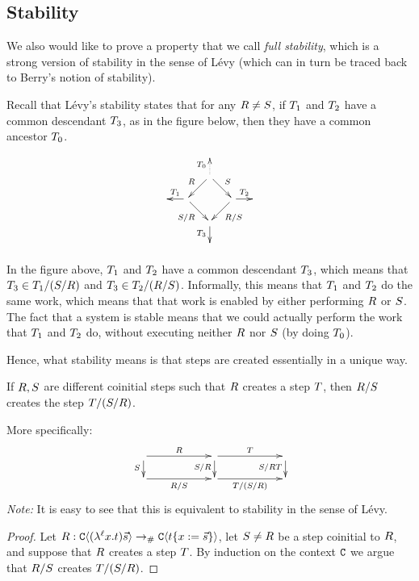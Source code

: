 \bigskip
\subsection*{Stability}

We also would like to prove a property that we call \emph{full stability},
which is a strong version of stability in the sense of Lévy \cite{levy_redex_stability}
(which can in turn be traced back to Berry's notion of stability).

Recall that L\'evy's stability states that for any $R \neq S$,
if $T_1$ and $T_2$ have a common descendant $T_3$, as in the figure below,
then they have a common ancestor $T_0$.
\[
  \xymatrix@C=.5cm@R=.5cm{
    &&&
  \\
    &
    & \ar@{.>}[u]^{\redexthree_0} \ar[dl]_{\redex} \ar[dr]^{\redextwo} &
  \\
    &
    \ar[l]_{\redexthree_1}
    \ar[dr]_{\redextwo/\redex} & & \ar[dl]^{\redex/\redextwo} \ar[r]^{\redexthree_2} &
  \\
    &
    & \ar[d]_{\redexthree_3} &
  \\
    &&&
  }
\]

In the figure above, $T_1$ and $T_2$ have a common descendant
$T_3$, which means that $T_3 \in T_1 / (S / R)$
and $T_3 \in T_2 / (R / S)$.
Informally, this means that $T_1$ and $T_2$ do the same work,
which means that that work is enabled by either performing $R$ or $S$.
The fact that a system is stable means that we could actually perform the work that
$T_1$ and $T_2$ do, without executing neither $R$ nor $S$
(by doing $T_0$).

Hence, what stability means is that steps are created essentially in a unique way.


\begin{lemma}[Stability]
If $R,S$ are different coinitial steps such that
$R$ creates a step $T$,
then $R/S$ creates the step $T/(S/R)$.

More specifically:
\[
  \xymatrix@R=.5cm@C=2cm{
    \ar[r]^{\redex}
    \ar[d]_{\redextwo}
    &
    \ar[r]^{\redexthree}
    \ar[d]_{\redextwo/\redex}
    &
    \ar[d]_{\redextwo/\redex\redexthree}
  \\
    \ar[r]_{\redex/\redextwo}
    &
    \ar[r]_{\redexthree/(\redextwo/\redex)}
    &
  }
\]
\emph{Note:} It is easy to see that this is equivalent to stability in the sense of Lévy.
\end{lemma}
\begin{proof}
Let $R : \mathtt{C}\langle(\lambda^{\ell} x. t)\vec{s}\rangle \mathrel{\to_{\mathtt{\#}}} \mathtt{C}\langle t\{x := \vec{s}\}\rangle$,
let $S \neq R$ be a step coinitial to $R$,
and suppose that $R$ creates a step $T$.
By induction on the context $\mathtt{C}$ we argue that $R/S$ creates $T/(S/R)$.
\end{proof}

